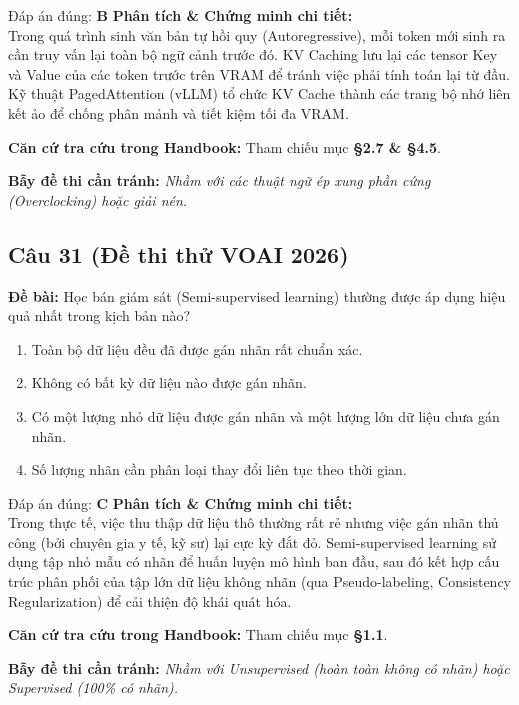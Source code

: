 \documentclass[10pt,a4paper]{article}
\begin{document}
\begin{solbox}{Đáp án đúng: \textbf{B}}
\textbf{Phân tích \& Chứng minh chi tiết:} \\
Trong quá trình sinh văn bản tự hồi quy (Autoregressive), mỗi token mới sinh ra cần truy vấn lại toàn bộ ngữ cảnh trước đó. KV Caching lưu lại các tensor Key và Value của các token trước trên VRAM để tránh việc phải tính toán lại từ đầu. Kỹ thuật PagedAttention (vLLM) tổ chức KV Cache thành các trang bộ nhớ liên kết ảo để chống phân mảnh và tiết kiệm tối đa VRAM.

\vspace{0.4em}
\textbf{Căn cứ tra cứu trong Handbook:} Tham chiếu mục \textbf{§2.7 \& §4.5}.

\vspace{0.4em}
\textbf{Bẫy đề thi cần tránh:} \textit{Nhầm với các thuật ngữ ép xung phần cứng (Overclocking) hoặc giải nén.}
\end{solbox}
\vspace{0.5em}


\subsection*{Câu 31 (Đề thi thử VOAI 2026)}
\textbf{Đề bài:} Học bán giám sát (Semi-supervised learning) thường được áp dụng hiệu quả nhất trong kịch bản nào?

\begin{enumerate}[label=\textbf{\Alph*.}]
    \item Toàn bộ dữ liệu đều đã được gán nhãn rất chuẩn xác.
    \item Không có bất kỳ dữ liệu nào được gán nhãn.
    \item Có một lượng nhỏ dữ liệu được gán nhãn và một lượng lớn dữ liệu chưa gán nhãn.
    \item Số lượng nhãn cần phân loại thay đổi liên tục theo thời gian.
\end{enumerate}

\begin{solbox}{Đáp án đúng: \textbf{C}}
\textbf{Phân tích \& Chứng minh chi tiết:} \\
Trong thực tế, việc thu thập dữ liệu thô thường rất rẻ nhưng việc gán nhãn thủ công (bởi chuyên gia y tế, kỹ sư) lại cực kỳ đắt đỏ. Semi-supervised learning sử dụng tập nhỏ mẫu có nhãn để huấn luyện mô hình ban đầu, sau đó kết hợp cấu trúc phân phối của tập lớn dữ liệu không nhãn (qua Pseudo-labeling, Consistency Regularization) để cải thiện độ khái quát hóa.

\vspace{0.4em}
\textbf{Căn cứ tra cứu trong Handbook:} Tham chiếu mục \textbf{§1.1}.

\vspace{0.4em}
\textbf{Bẫy đề thi cần tránh:} \textit{Nhầm với Unsupervised (hoàn toàn không có nhãn) hoặc Supervised (100\% có nhãn).}
\end{solbox}
\vspace{0.5em}
\end{document}
